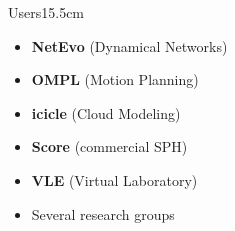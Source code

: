\documentclass[final,hyperref={pdfpagelabels=false}]{beamer}
\begin{document}
\begin{frame}[fragile]{}
\begin{columns}[t]
  \begin{column}{0.24\linewidth}
    \begin{blockwh}{Users}{15.5cm}
    \begin{itemize}
     \item \textbf{NetEvo} {\small (Dynamical Networks)}\\[.5em]
     \item \textbf{OMPL} {\small (Motion Planning)}\\[.5em]
     \item \textbf{icicle} {\small (Cloud Modeling)}\\[.5em]
     \item \textbf{Score} {\small (commercial SPH)}\\[.5em]
     \item \textbf{VLE} {\small (Virtual Laboratory)}\\[.5em]
     \item Several research groups
    \end{itemize}
    \end{blockwh}
  \end{column}
\end{columns}
\vglue-2cm
\end{frame}
\end{document}
